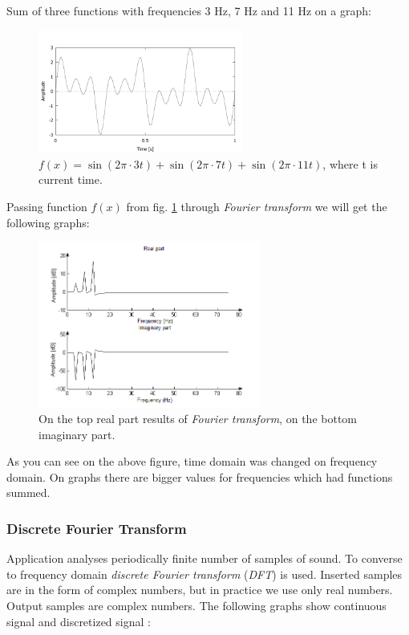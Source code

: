 \documentclass[11pt,titlepage]{article}
\theoremstyle{plain}
\begin{document}
Sum of three functions with frequencies 3 Hz, 7 Hz and 11 Hz on a graph:
\begin{figure}[H]
	\centering
	\includegraphics[width=0.6\textwidth]{img/sines.pdf}
	\caption{$f(x) = \sin(2\pi \cdot 3t)+\sin(2 \pi \cdot 7 t)+\sin(2  \pi \cdot 11  t)$, where t is current time.}
	\label{fig:F4}
\end{figure}

Passing function $f(x)$ from fig. \ref{fig:F4} through \textit{Fourier transform} we will get the following graphs:

\begin{figure}[H]
	\centering
	\includegraphics[width=0.65\textwidth]{img/both_real_imag}
	\caption{On the top real part results of \textit{Fourier transform}, on the bottom imaginary part.}
	\label{fig:F5}
\end{figure}

As you can see on the above figure, time domain was changed on frequency domain. On graphs there are bigger values for frequencies which had functions summed.

\subsubsection{Discrete Fourier Transform}
Application analyses periodically finite number of samples of sound. To converse to frequency domain \textit{discrete Fourier transform} (\textit{DFT}) is used. Inserted samples are in the form of complex numbers, but in practice we use only real numbers. Output samples are complex numbers. The following graphs show continuous signal and discretized signal \cite{fourier}:
\end{document}

